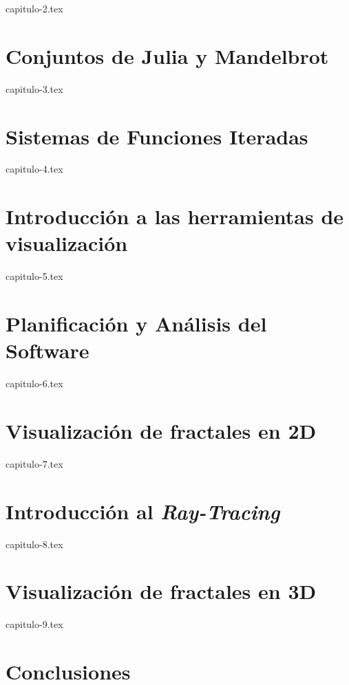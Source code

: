 \documentclass[twoside,openright,11pt]{report}
\begin{document}
{capitulo-2.tex}


\chapter{Conjuntos de Julia y Mandelbrot}
\label{chap:Julia-Mandelbrot}

{capitulo-3.tex}

\chapter{Sistemas de Funciones Iteradas}
\label{chap:SFI}

{capitulo-4.tex}

\chapter{Introducción a las herramientas de visualización}
\label{chap:visualizacion}

{capitulo-5.tex}

\chapter{Planificación y Análisis del Software}
\label{chap:planificacion-analisis}

{capitulo-6.tex}

\chapter{Visualización de fractales en 2D}
\label{chap:fractales-2D}

{capitulo-7.tex}

\chapter{Introducción al \textit{Ray-Tracing}}
\label{chap:ray-tracing}

{capitulo-8.tex}

\chapter{Visualización de fractales en 3D}
\label{chap:fractales-3D}

{capitulo-9.tex}

\chapter*{Conclusiones}
\label{chap:conclusiones}
\end{document}
